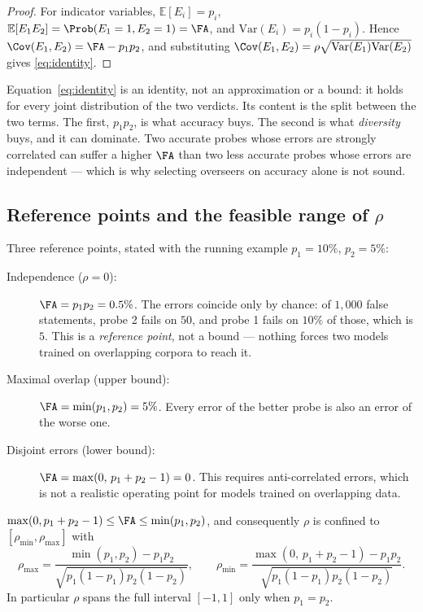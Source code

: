 \begin{proof}
For indicator variables, $\mathbb{E}[E_i] = p_i$, $\mathbb{E}[E_1 E_2] =
\Prob(E_1=1, E_2=1) = \FA$, and $\mathrm{Var}(E_i) = p_i(1-p_i)$. Hence
$\Cov(E_1, E_2) = \FA - p_1 p_2$, and substituting
$\Cov(E_1,E_2) = \rho \sqrt{\mathrm{Var}(E_1)\mathrm{Var}(E_2)}$ gives
\eqref{eq:identity}.
\end{proof}

Equation~\eqref{eq:identity} is an identity, not an approximation or a bound: it
holds for every joint distribution of the two verdicts. Its content is the split
between the two terms. The first, $p_1 p_2$, is what accuracy buys. The second is
what \emph{diversity} buys, and it can dominate. Two accurate probes whose errors
are strongly correlated can suffer a higher $\FA$ than two less accurate probes
whose errors are independent --- which is why selecting overseers on accuracy
alone is not sound.

\subsection{Reference points and the feasible range of $\rho$}
\label{sec:theory:bounds}

Three reference points, stated with the running example $p_1 = 10\%$,
$p_2 = 5\%$:

\begin{description}
  \item[Independence ($\rho = 0$):] $\FA = p_1 p_2 = 0.5\%$. The errors coincide
    only by chance: of $1{,}000$ false statements, probe 2 fails on $50$, and
    probe 1 fails on $10\%$ of those, which is $5$. This is a \emph{reference
    point}, not a bound --- nothing forces two models trained on overlapping
    corpora to reach it.
  \item[Maximal overlap (upper bound):] $\FA = \min(p_1, p_2) = 5\%$. Every error
    of the better probe is also an error of the worse one.
  \item[Disjoint errors (lower bound):] $\FA = \max(0,\, p_1 + p_2 - 1) = 0$.
    This requires anti-correlated errors, which is not a realistic operating
    point for models trained on overlapping data.
\end{description}

\begin{proposition}
\label{prop:frechet}
$\max(0, p_1 + p_2 - 1) \le \FA \le \min(p_1, p_2)$, and consequently $\rho$ is
confined to $[\rho_{\min}, \rho_{\max}]$ with
\begin{equation}
  \rho_{\max} = \frac{\min(p_1,p_2) - p_1 p_2}{\sqrt{p_1(1-p_1)p_2(1-p_2)}},
  \qquad
  \rho_{\min} = \frac{\max(0,\,p_1+p_2-1) - p_1 p_2}{\sqrt{p_1(1-p_1)p_2(1-p_2)}}.
  \label{eq:rhorange}
\end{equation}
In particular $\rho$ spans the full interval $[-1, 1]$ only when $p_1 = p_2$.
\end{proposition}

